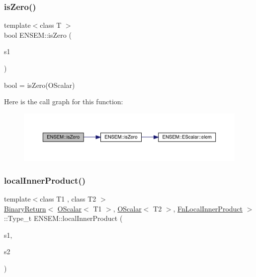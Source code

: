 \subsubsection{\texorpdfstring{isZero()}{isZero()}}
{\footnotesize\ttfamily template$<$class T $>$ \\
bool E\+N\+S\+E\+M\+::is\+Zero (\begin{DoxyParamCaption}\item[{const \mbox{\hyperlink{classENSEM_1_1OScalar}{O\+Scalar}}$<$ T $>$ \&}]{s1 }\end{DoxyParamCaption})}



bool = is\+Zero(\+O\+Scalar) 

Here is the call graph for this function\+:\nopagebreak
\begin{figure}[H]
\begin{center}
\leavevmode
\includegraphics[width=350pt]{d1/d71/group__obsscalar_gacdda3d4e73f6b414d6c2d99e3f69af85_cgraph}
\end{center}
\end{figure}
\mbox{\label{group__obsscalar_ga17966d3d3b6922670f83bb3f96b1cd76}} 
\subsubsection{\texorpdfstring{localInnerProduct()}{localInnerProduct()}}
{\footnotesize\ttfamily template$<$class T1 , class T2 $>$ \\
\mbox{\hyperlink{structENSEM_1_1BinaryReturn}{Binary\+Return}}$<$ \mbox{\hyperlink{classENSEM_1_1OScalar}{O\+Scalar}}$<$ T1 $>$, \mbox{\hyperlink{classENSEM_1_1OScalar}{O\+Scalar}}$<$ T2 $>$, \mbox{\hyperlink{structENSEM_1_1FnLocalInnerProduct}{Fn\+Local\+Inner\+Product}} $>$\+::Type\+\_\+t E\+N\+S\+E\+M\+::local\+Inner\+Product (\begin{DoxyParamCaption}\item[{const \mbox{\hyperlink{classENSEM_1_1OScalar}{O\+Scalar}}$<$ T1 $>$ \&}]{s1,  }\item[{const \mbox{\hyperlink{classENSEM_1_1OScalar}{O\+Scalar}}$<$ T2 $>$ \&}]{s2 }\end{DoxyParamCaption})\hspace{0.3cm}{\ttfamily [inline]}}

